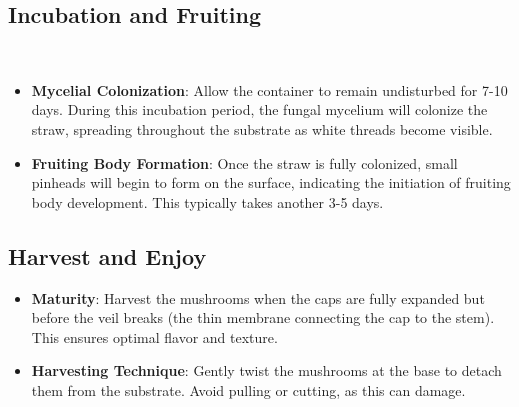 \subsection{Incubation and Fruiting}\
\begin{itemize}
    \item \textbf{Mycelial Colonization}: Allow the container to remain undisturbed for 7-10 days. During this incubation period, the fungal mycelium will colonize the straw, spreading throughout the substrate as white threads become visible.
    \item \textbf{Fruiting Body Formation}: Once the straw is fully colonized, small pinheads will begin to form on the surface, indicating the initiation of fruiting body development. This typically takes another 3-5 days.
\end{itemize}
\subsection{Harvest and Enjoy}
\begin{itemize}
    \item \textbf{Maturity}: Harvest the mushrooms when the caps are fully expanded but before the veil breaks (the thin membrane connecting the cap to the stem). This ensures optimal flavor and texture.
    \item \textbf{Harvesting Technique}: Gently twist the mushrooms at the base to detach them from the substrate. Avoid pulling or cutting, as this can damage.
\end{itemize}